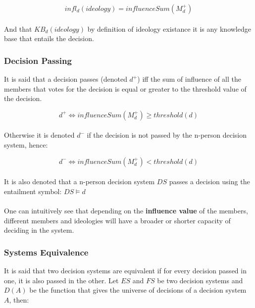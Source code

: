 $$infl_{d}(ideology) = influenceSum(M_{d}^{+})$$

\paragraph{}

And that $KB_{d}(ideology)$ by definition of ideology existance it is any knowledge base that entails the decision. 

\subsubsection{Decision Passing} 

It is said that a decision passes (denoted $d^{+}$) iff the sum of influence of all the members that votes for the decision is equal or greater to the threshold value of the decision.

$$ d^{+} \iff influenceSum(M_{d}^{+}) \geq threshold(d)$$

\paragraph{}

Otherwise it is denoted $d^{-}$ if the decision is not passed by the n-person decision system, hence:

$$ d^{-} \iff influenceSum(M_{d}^{+}) < threshold(d)$$

\paragraph{}

It is also denoted that a n-person decision system $DS$ passes a decision using the entailment symbol: $DS \models d$

\paragraph{}

One can intuitively see that depending on the \textbf{influence value} of the members, different members and ideologies will have a broader or shorter capacity of deciding in the system.

\subsubsection{Systems Equivalence} 

It is said that two decision systems are equivalent if for every decision passed in one, it is also passed in the other. Let $ES$ and $FS$ be two decision systems and $D(A)$ be the function that gives the universe of decisions of a decision system $A$, then:

